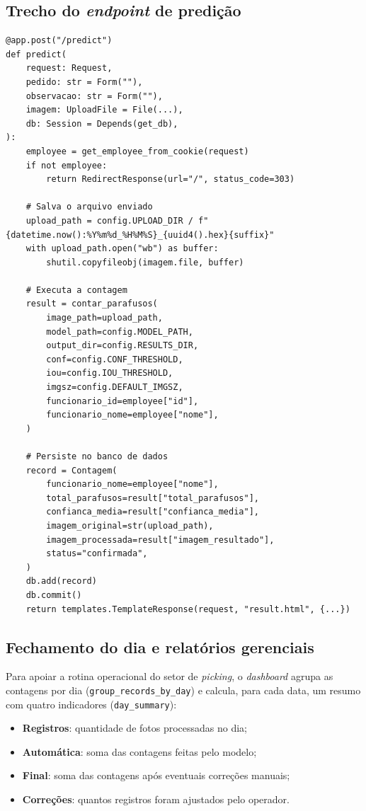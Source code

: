 \documentclass[12pt,a4paper]{article}
\begin{document}
\subsection{Trecho do \emph{endpoint} de predi\c{c}\~ao}

\begin{lstlisting}[caption={Endpoint \texttt{POST /predict} (\texttt{app/main.py})}]
@app.post("/predict")
def predict(
    request: Request,
    pedido: str = Form(""),
    observacao: str = Form(""),
    imagem: UploadFile = File(...),
    db: Session = Depends(get_db),
):
    employee = get_employee_from_cookie(request)
    if not employee:
        return RedirectResponse(url="/", status_code=303)

    # Salva o arquivo enviado
    upload_path = config.UPLOAD_DIR / f"{datetime.now():%Y%m%d_%H%M%S}_{uuid4().hex}{suffix}"
    with upload_path.open("wb") as buffer:
        shutil.copyfileobj(imagem.file, buffer)

    # Executa a contagem
    result = contar_parafusos(
        image_path=upload_path,
        model_path=config.MODEL_PATH,
        output_dir=config.RESULTS_DIR,
        conf=config.CONF_THRESHOLD,
        iou=config.IOU_THRESHOLD,
        imgsz=config.DEFAULT_IMGSZ,
        funcionario_id=employee["id"],
        funcionario_nome=employee["nome"],
    )

    # Persiste no banco de dados
    record = Contagem(
        funcionario_nome=employee["nome"],
        total_parafusos=result["total_parafusos"],
        confianca_media=result["confianca_media"],
        imagem_original=str(upload_path),
        imagem_processada=result["imagem_resultado"],
        status="confirmada",
    )
    db.add(record)
    db.commit()
    return templates.TemplateResponse(request, "result.html", {...})
\end{lstlisting}

\subsection{Fechamento do dia e relat\'orios gerenciais}

Para apoiar a rotina operacional do setor de \emph{picking}, o \emph{dashboard} agrupa as
contagens por dia (\texttt{group\_records\_by\_day}) e calcula, para cada data, um resumo
com quatro indicadores (\texttt{day\_summary}):

\begin{itemize}[leftmargin=*]
  \item \textbf{Registros}: quantidade de fotos processadas no dia;
  \item \textbf{Autom\'atica}: soma das contagens feitas pelo modelo;
  \item \textbf{Final}: soma das contagens ap\'os eventuais corre\c{c}\~oes manuais;
  \item \textbf{Corre\c{c}\~oes}: quantos registros foram ajustados pelo operador.
\end{itemize}
\end{document}

